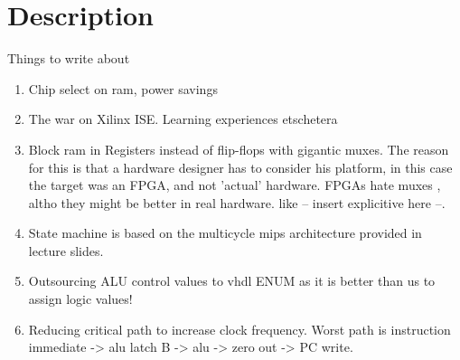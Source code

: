 \section{Description}


Things to write about

\begin{enumerate}
  \item
    Chip select on ram, power savings

  \item
    The war on Xilinx ISE. Learning experiences etschetera

  \item
    Block ram in Registers instead of flip-flops with gigantic muxes. The reason for this is that a hardware designer has to consider his platform, in this case the target was an FPGA, and not 'actual' hardware. FPGAs hate muxes , altho they might be better in real hardware. like -- insert explicitive here --.

  \item
    State machine is based on the multicycle mips architecture provided in lecture slides.

  \item
    Outsourcing ALU control values to vhdl ENUM as it is better than us to assign logic values!

  \item
    Reducing critical path to increase clock frequency. Worst path is instruction immediate -> alu latch B -> alu -> zero out -> PC write.


\end{enumerate}
